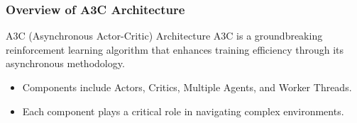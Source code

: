 \documentclass{beamer}
\begin{document}
\begin{frame}[fragile]
    \frametitle{Overview of A3C Architecture}
    
    \begin{block}{A3C (Asynchronous Actor-Critic) Architecture}
        A3C is a groundbreaking reinforcement learning algorithm that enhances training efficiency through its asynchronous methodology.
    \end{block}
    
    \begin{itemize}
        \item Components include Actors, Critics, Multiple Agents, and Worker Threads.
        \item Each component plays a critical role in navigating complex environments.
    \end{itemize}
\end{frame}
\end{document}
